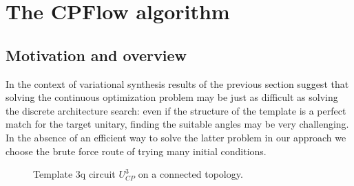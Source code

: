 \documentclass[draft, amsfonts, amssymb, aps, nofootinbib, twocolumn]{revtex4-2}
\begin{document}
\section{The CPFlow algorithm}
\subsection{Motivation and overview}
In the context of variational synthesis results of the previous section suggest that solving the continuous optimization problem may be just as difficult as solving the discrete architecture search: even if the structure of the template is a perfect match for the target unitary, finding the suitable angles may be very challenging. In the absence of an efficient way to solve the latter problem in our approach we choose the brute force route of trying many initial conditions. 
\begin{figure*}
	\caption{ Template 3q circuit $U_{CP}^3$ on a connected topology.}
	\label{fig cp template}
\end{figure*}
\end{document}
